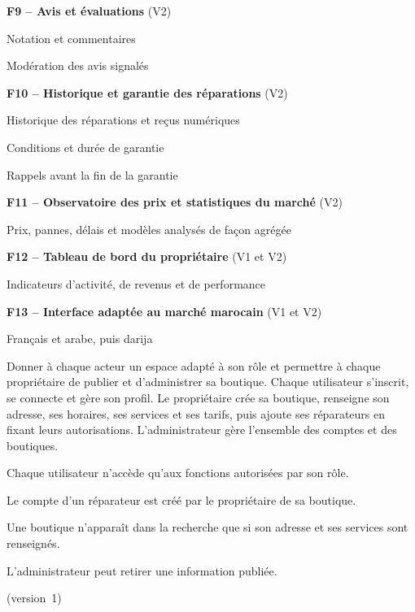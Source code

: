 \begin{cdcitems}
  \item \textbf{F9 – Avis et évaluations} (V2)
  \begin{cdcsousitems}
    \item Notation et commentaires
    \item Modération des avis signalés
  \end{cdcsousitems}
  \item \textbf{F10 – Historique et garantie des réparations} (V2)
  \begin{cdcsousitems}
    \item Historique des réparations et reçus numériques
    \item Conditions et durée de garantie
    \item Rappels avant la fin de la garantie
  \end{cdcsousitems}
  \item \textbf{F11 – Observatoire des prix et statistiques du marché} (V2)
  \begin{cdcsousitems}
    \item Prix, pannes, délais et modèles analysés de façon agrégée
  \end{cdcsousitems}
  \item \textbf{F12 – Tableau de bord du propriétaire} (V1 et V2)
  \begin{cdcsousitems}
    \item Indicateurs d’activité, de revenus et de performance
  \end{cdcsousitems}
  \item \textbf{F13 – Interface adaptée au marché marocain} (V1 et V2)
  \begin{cdcsousitems}
    \item Français et arabe, puis darija
  \end{cdcsousitems}
\end{cdcitems}


  {Donner à chaque acteur un espace adapté à son rôle et permettre à chaque propriétaire de publier et d’administrer sa boutique.}
  {Chaque utilisateur s’inscrit, se connecte et gère son profil. Le propriétaire crée sa boutique, renseigne son adresse, ses horaires, ses services et ses tarifs, puis ajoute ses réparateurs en fixant leurs autorisations. L’administrateur gère l’ensemble des comptes et des boutiques.}
  {\begin{cdccellitems}
    \item Chaque utilisateur n’accède qu’aux fonctions autorisées par son rôle.
    \item Le compte d’un réparateur est créé par le propriétaire de sa boutique.
    \item Une boutique n’apparaît dans la recherche que si son adresse et ses services sont renseignés.
    \item L’administrateur peut retirer une information publiée.
  \end{cdccellitems}}
  {\prioMust{} (version~1)}


